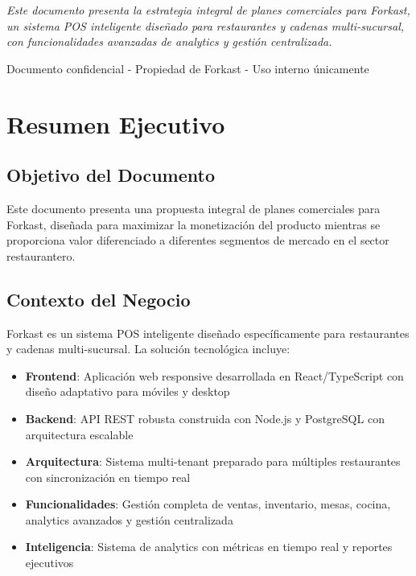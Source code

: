 \documentclass[12pt,a4paper]{article}
\begin{document}
\begin{titlepage}
    \vspace{2cm}
    
    \begin{tcolorbox}[colback=accentpurple!5, colframe=accentpurple, width=0.8\textwidth, center]
        \centering
        {\normalsize\itshape\color{accentpurple}
        Este documento presenta la estrategia integral de planes comerciales para Forkast,\\
        un sistema POS inteligente diseñado para restaurantes y cadenas multi-sucursal,\\
        con funcionalidades avanzadas de analytics y gestión centralizada.
        }
    \end{tcolorbox}
    
    \vfill
    
    {\small\color{gray} Documento confidencial - Propiedad de Forkast - Uso interno únicamente}
\end{titlepage}

\newpage
\tableofcontents
\newpage

\section{Resumen Ejecutivo}

\subsection{Objetivo del Documento}

Este documento presenta una propuesta integral de planes comerciales para Forkast, diseñada para maximizar la monetización del producto mientras se proporciona valor diferenciado a diferentes segmentos de mercado en el sector restaurantero.

\subsection{Contexto del Negocio}

Forkast es un sistema POS inteligente diseñado específicamente para restaurantes y cadenas multi-sucursal. La solución tecnológica incluye:

\begin{itemize}
    \item \textbf{Frontend}: Aplicación web responsive desarrollada en React/TypeScript con diseño adaptativo para móviles y desktop
    \item \textbf{Backend}: API REST robusta construida con Node.js y PostgreSQL con arquitectura escalable
    \item \textbf{Arquitectura}: Sistema multi-tenant preparado para múltiples restaurantes con sincronización en tiempo real
    \item \textbf{Funcionalidades}: Gestión completa de ventas, inventario, mesas, cocina, analytics avanzados y gestión centralizada
    \item \textbf{Inteligencia}: Sistema de analytics con métricas en tiempo real y reportes ejecutivos
\end{itemize}
\end{document}
